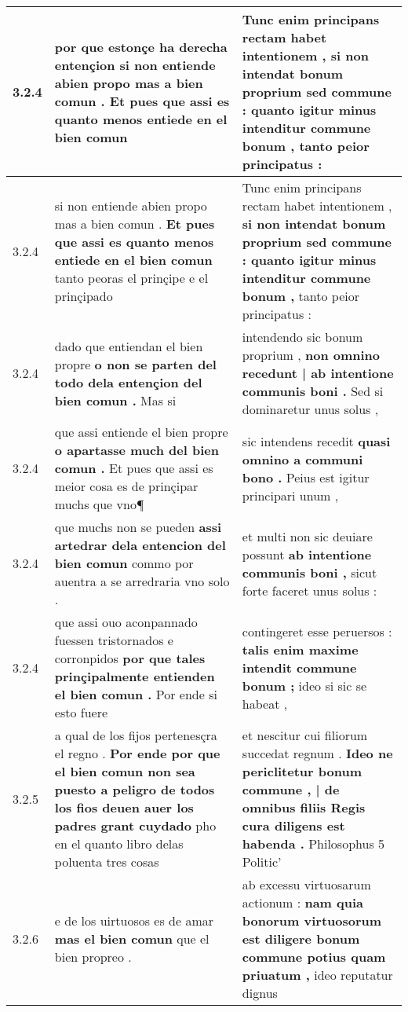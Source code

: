 \begin{tabular}{|p{1cm}|p{6.5cm}|p{6.5cm}|}
3.2.4 & por que estonçe ha derecha entençion \textbf{ si non entiende abien propo mas a bien comun . } Et pues que assi es quanto menos entiede en el bien comun & Tunc enim principans rectam habet intentionem , \textbf{ si non intendat bonum proprium sed commune : quanto igitur minus intenditur commune bonum , } tanto peior principatus : \\\hline
3.2.4 & si non entiende abien propo mas a bien comun . \textbf{ Et pues que assi es quanto menos entiede en el bien comun } tanto peoras el prinçipe e el prinçipado & Tunc enim principans rectam habet intentionem , \textbf{ si non intendat bonum proprium sed commune : quanto igitur minus intenditur commune bonum , } tanto peior principatus : \\\hline
3.2.4 & dado que entiendan el bien propre \textbf{ o non se parten del todo dela entençion del bien comun . } Mas si & intendendo sic bonum proprium , \textbf{ non omnino recedunt | ab intentione communis boni . } Sed si dominaretur unus solus , \\\hline
3.2.4 & que assi entiende el bien propre \textbf{ o apartasse much del bien comun . } Et pues que assi es meior cosa es de prinçipar muchs que vno¶ & sic intendens recedit \textbf{ quasi omnino a communi bono . } Peius est igitur principari unum , \\\hline
3.2.4 & que muchs non se pueden \textbf{ assi artedrar dela entencion del bien comun } commo por auentra a se arredraria vno solo . & et multi non sic deuiare possunt \textbf{ ab intentione communis boni , } sicut forte faceret unus solus : \\\hline
3.2.4 & que assi ouo aconpannado fuessen tristornados e corronpidos \textbf{ por que tales prinçipalmente entienden el bien comun . } Por ende si esto fuere & contingeret esse peruersos : \textbf{ talis enim maxime intendit commune bonum ; } ideo si sic se habeat , \\\hline
3.2.5 & a qual de los fijos pertenesçra el regno . \textbf{ Por ende por que el bien comun non sea puesto a peligro de todos los fios deuen auer los padres grant cuydado } pho en el quanto libro delas poluenta tres cosas & et nescitur cui filiorum succedat regnum . \textbf{ Ideo ne periclitetur bonum commune , | de omnibus filiis Regis cura diligens est habenda . } Philosophus 5 Politic’ \\\hline
3.2.6 & e de los uirtuosos es de amar \textbf{ mas el bien comun } que el bien propreo . & ab excessu virtuosarum actionum : \textbf{ nam quia bonorum virtuosorum est diligere bonum commune potius quam priuatum , } ideo reputatur dignus \\\hline

\end{tabular}
